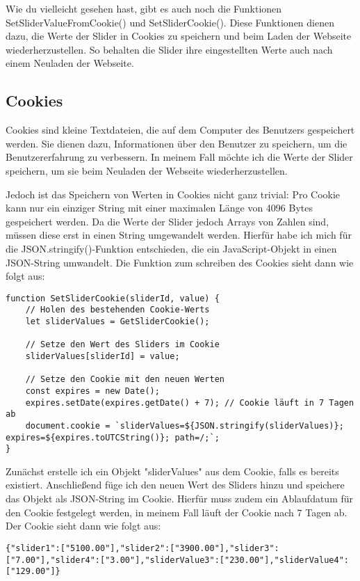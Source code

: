Wie du vielleicht gesehen hast, gibt es auch noch die Funktionen SetSliderValueFromCookie() und SetSliderCookie(). Diese Funktionen dienen dazu, die Werte der Slider in Cookies zu speichern und beim Laden der Webseite wiederherzustellen. So behalten die Slider ihre eingestellten Werte auch nach einem Neuladen der Webseite.

\subsection{Cookies}

Cookies sind kleine Textdateien, die auf dem Computer des Benutzers gespeichert werden. Sie dienen dazu, Informationen über den Benutzer zu speichern, um die Benutzererfahrung zu verbessern. In meinem Fall möchte ich die Werte der Slider speichern, um sie beim Neuladen der Webseite wiederherzustellen.

Jedoch ist das Speichern von Werten in Cookies nicht ganz trivial: Pro Cookie kann nur ein einziger String mit einer maximalen Länge von 4096 Bytes gespeichert werden. Da die Werte der Slider jedoch Arrays von Zahlen sind, müssen diese erst in einen String umgewandelt werden. Hierfür habe ich mich für die JSON.stringify()-Funktion entschieden, die ein JavaScript-Objekt in einen JSON-String umwandelt. Die Funktion zum schreiben des Cookies sieht dann wie folgt aus:

\begin{lstlisting}[style=JavaScript]
function SetSliderCookie(sliderId, value) {
    // Holen des bestehenden Cookie-Werts
    let sliderValues = GetSliderCookie();

    // Setze den Wert des Sliders im Cookie
    sliderValues[sliderId] = value;

    // Setze den Cookie mit den neuen Werten
    const expires = new Date();
    expires.setDate(expires.getDate() + 7); // Cookie läuft in 7 Tagen ab
    document.cookie = `sliderValues=${JSON.stringify(sliderValues)}; expires=${expires.toUTCString()}; path=/;`;
}
\end{lstlisting}

Zunächst erstelle ich ein Objekt "sliderValues" aus dem Cookie, falls es bereits existiert. Anschließend füge ich den neuen Wert des Sliders hinzu und speichere das Objekt als JSON-String im Cookie. Hierfür muss zudem ein Ablaufdatum für den Cookie festgelegt werden, in meinem Fall läuft der Cookie nach 7 Tagen ab. Der Cookie sieht dann wie folgt aus:

\begin{lstlisting}[style=JavaScript]
{"slider1":["5100.00"],"slider2":["3900.00"],"slider3":["7.00"],"slider4":["3.00"],"sliderValue3":["230.00"],"sliderValue4":["129.00"]}
\end{lstlisting}

